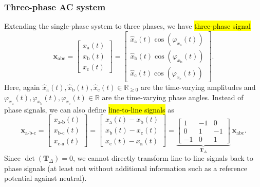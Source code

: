 \begin{frame}
    \frametitle{Three-phase AC system}
    Extending the single-phase system to three phases, we have \hl{three-phase signal}
    \begin{equation}
        \bm{x}_\mathrm{abc} = \begin{bmatrix}
            x_\mathrm{a}(t) \\
            x_\mathrm{b}(t) \\
            x_\mathrm{c}(t)
        \end{bmatrix} = \begin{bmatrix}
            \hat{x}_\mathrm{a}(t)\cos(\varphi_{x_\mathrm{a}}(t)) \\
            \hat{x}_\mathrm{b}(t)\cos(\varphi_{x_\mathrm{b}}(t)) \\
            \hat{x}_\mathrm{c}(t)\cos(\varphi_{x_\mathrm{c}}(t))
        \end{bmatrix}.
    \end{equation}
    Here, again $\hat{x}_\mathrm{a}(t), \hat{x}_\mathrm{b}(t), \hat{x}_\mathrm{c}(t)\in\mathbb{R}_{\geq 0}$ are the time-varying amplitudes and $\varphi_{x_\mathrm{a}}(t), \varphi_{x_\mathrm{b}}(t), \varphi_{x_\mathrm{c}}(t)\in\mathbb{R}$ are the time-varying phase angles. \pause Instead of phase signals, we can also define \hl{line-to-line signals} as
    \begin{equation}
        \bm{x}_\mathrm{a\text{-}b\text{-}c} = \begin{bmatrix}
            x_\mathrm{a\text{-}b}(t) \\
            x_\mathrm{b\text{-}c}(t) \\
            x_\mathrm{c\text{-}a}(t)
        \end{bmatrix} = \begin{bmatrix}
            x_\mathrm{a}(t) - x_\mathrm{b}(t) \\
            x_\mathrm{b}(t) - x_\mathrm{c}(t) \\
            x_\mathrm{c}(t) - x_\mathrm{a}(t)
        \end{bmatrix} = \underbrace{\begin{bmatrix}
                1  & -1 & 0  \\
                0  & 1  & -1 \\
                -1 & 0  & 1
            \end{bmatrix}}_{\bm{T}_\Delta} \
        \bm{x}_\mathrm{abc}.
    \end{equation}
    Since $\det(\bm{T}_\Delta) = 0$, we cannot directly transform line-to-line signals back to phase signals (at least not without additional information such as a reference potential against neutral).
\end{frame}


